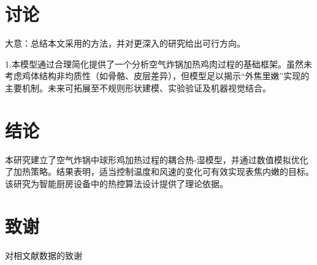 \documentclass[12pt]{article}
\begin{document}
\section{讨论}
大意：总结本文采用的方法，并对更深入的研究给出可行方向。
\par 1.本模型通过合理简化提供了一个分析空气炸锅加热鸡肉过程的基础框架。虽然未考虑鸡体结构非均质性（如骨骼、皮层差异），但模型足以揭示“外焦里嫩”实现的主要机制。未来可拓展至不规则形状建模、实验验证及机器视觉结合。


\section{结论}
本研究建立了空气炸锅中球形鸡加热过程的耦合热-湿模型，并通过数值模拟优化了加热策略。结果表明，适当控制温度和风速的变化可有效实现表焦内嫩的目标。该研究为智能厨房设备中的热控算法设计提供了理论依据。

\section*{致谢}
\begin{summarybox}
	对相文献数据的致谢
\end{summarybox}



\end{document}
